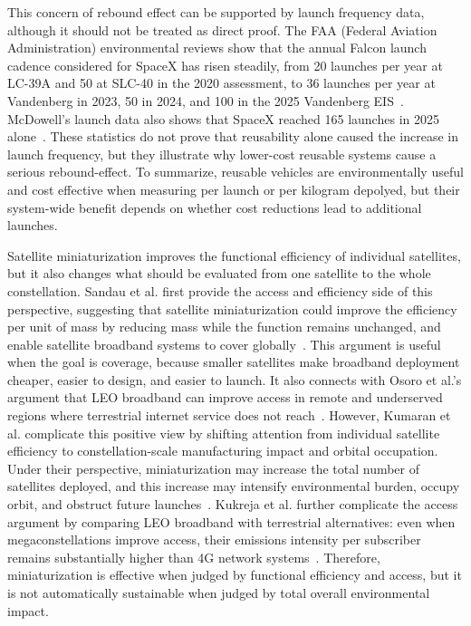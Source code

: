 \documentclass[12pt]{article}
\begin{document}
This concern of rebound effect can be supported by launch frequency data, although it should not be treated as direct proof. The FAA (Federal Aviation Administration) environmental reviews show that the annual Falcon launch cadence considered for SpaceX has risen steadily, from 20 launches per year at LC-39A and 50 at SLC-40 in the 2020 assessment, to 36 launches per year at Vandenberg in 2023, 50 in 2024, and 100 in the 2025 Vandenberg EIS~\citep{faa2025falconprogram}. McDowell's launch data also shows that SpaceX reached 165 launches in 2025 alone~\citep{mcdowell2025space}. These statistics do not prove that reusability alone caused the increase in launch frequency, but they illustrate why lower-cost reusable systems cause a serious rebound-effect. To summarize, reusable vehicles are environmentally useful and cost effective when measuring per launch or per kilogram depolyed, but their system-wide benefit depends on whether cost reductions lead to additional launches.



Satellite miniaturization improves the functional efficiency of individual satellites, but it also changes what should be evaluated from one satellite to the whole constellation. Sandau et al. first provide the access and efficiency side of this perspective, suggesting that satellite miniaturization could improve the efficiency per unit of mass by reducing mass while the function remains unchanged, and enable satellite broadband systems to cover globally~\citep{sandau2010smallsat}. This argument is useful when the goal is coverage, because smaller satellites make broadband deployment cheaper, easier to design, and easier to launch. It also connects with Osoro et al.'s argument that LEO broadband can improve access in remote and underserved regions where terrestrial internet service does not reach~\citep{osoro2025leo}. However, Kumaran et al. complicate this positive view by shifting attention from individual satellite efficiency to constellation-scale manufacturing impact and orbital occupation. Under their perspective, miniaturization may increase the total number of satellites deployed, and this increase may intensify environmental burden, occupy orbit, and obstruct future launches~\citep{kumaran2024manufacturing}. Kukreja et al. further complicate the access argument by comparing LEO broadband with terrestrial alternatives: even when megaconstellations improve access, their emissions intensity per subscriber remains substantially higher than 4G network systems~\citep{kukreja2025leo}. Therefore, miniaturization is effective when judged by functional efficiency and access, but it is not automatically sustainable when judged by total overall environmental impact.
\end{document}
